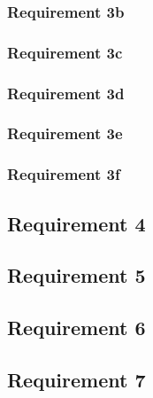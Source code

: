 \documentclass[a4paper]{article}
\begin{document}
    \subsubsection{Requirement 3b}
    
    
    \subsubsection{Requirement 3c}
    
    
    \subsubsection{Requirement 3d}
    
    
    \subsubsection{Requirement 3e}
    
    
    \subsubsection{Requirement 3f}
    
    
    \subsection{Requirement 4}
    
    
    \subsection{Requirement 5}
    
    
    \subsection{Requirement 6}
    
    
    \subsection{Requirement 7}
    
    
\end{document}
